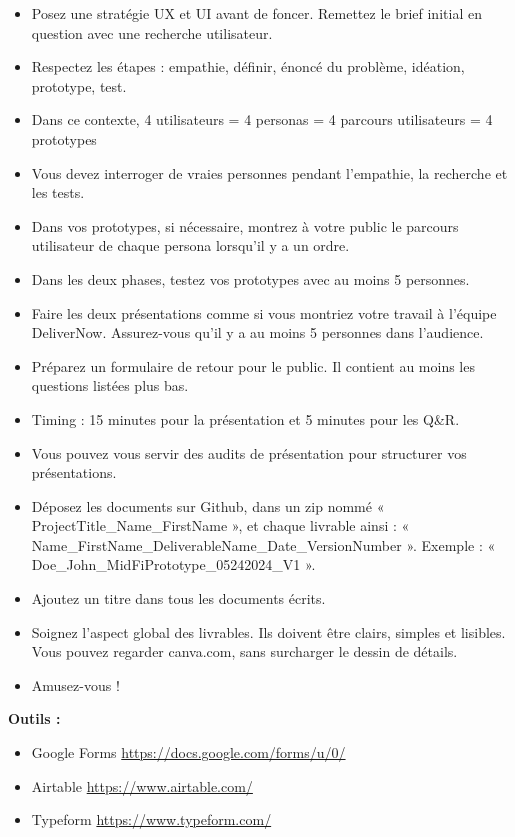 \begin{itemize}
\item Posez une stratégie UX et UI avant de foncer. Remettez le brief initial en question avec une recherche utilisateur.
\item Respectez les étapes : empathie, définir, énoncé du problème, idéation, prototype, test.
\item Dans ce contexte, 4 utilisateurs = 4 personas = 4 parcours utilisateurs = 4 prototypes
\item Vous devez interroger de vraies personnes pendant l'empathie, la recherche et les tests.
\item Dans vos prototypes, si nécessaire, montrez à votre public le parcours utilisateur de chaque persona lorsqu'il y a un ordre.
\item Dans les deux phases, testez vos prototypes avec au moins 5 personnes.
\item Faire les deux présentations comme si vous montriez votre travail à l'équipe DeliverNow. Assurez-vous qu'il y a au moins 5 personnes dans l'audience.
\item Préparez un formulaire de retour pour le public. Il contient au moins les questions listées plus bas.
\item Timing : 15 minutes pour la présentation et 5 minutes pour les Q\&R.
\item Vous pouvez vous servir des audits de présentation pour structurer vos présentations.
\item Déposez les documents sur Github, dans un zip nommé « ProjectTitle\_Name\_FirstName », et chaque livrable ainsi : « Name\_FirstName\_DeliverableName\_Date\_VersionNumber ». Exemple : « Doe\_John\_MidFiPrototype\_05242024\_V1 ».
\item Ajoutez un titre dans tous les documents écrits.
\item Soignez l'aspect global des livrables. Ils doivent être clairs, simples et lisibles. Vous pouvez regarder canva.com, sans surcharger le dessin de détails.
\item Amusez-vous !
\end{itemize}

\textbf{Outils :}

\begin{itemize}
\item Google Forms \url{https://docs.google.com/forms/u/0/}
\item Airtable \url{https://www.airtable.com/}
\item Typeform \url{https://www.typeform.com/}
\end{itemize}

